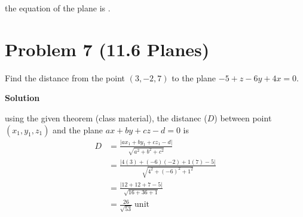 \documentclass{article}
\newcommand{\solution}{\textbf{\large Solution}}
\theoremstyle{remark}
\begin{document}
the equation of the plane is .

\vspace{1em}
\hrulefill

\newpage

\section*{Problem 7 (11.6 Planes)}
Find the distance from the point $(3, -2, 7)$ to the plane $-5 + z - 6y + 4x = 0$.

\medskip
\solution

using the given theorem (class material), the distanec ($D$)
  between point $(x_1, y_1, z_1)$ and the plane $ax + by + cz
  -d = 0$ is
  \[
  \begin{aligned}
  D &= \frac{\lvert ax_1 + by_1 + cz_1 - d \rvert}{\sqrt{a^2 +
  b^2 + c^2}} \\
  &= \frac{\lvert 4(3) + (-6)(-2) + 1(7) - 5 \rvert}{\sqrt{4^2
  + (-6)^2 + 1^2}} \\
  &= \frac{\lvert 12 + 12 + 7 - 5 \rvert}{\sqrt{16 + 36 + 1}}
  \\
  &= \boxed{\frac{26}{\sqrt{53}}\
  \text{unit}}
  \end{aligned}
  \]

\vspace{1em}
\hrulefill
\end{document}
